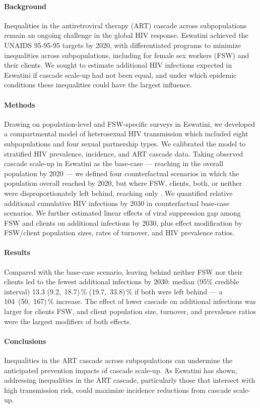 \paragraph{Background}
Inequalities in the antiretroviral therapy (ART) cascade across subpopulations
remain an ongoing challenge in the global HIV response.
Eswatini achieved the UNAIDS 95-95-95 targets by 2020,
with differentiated programs to minimize inequalities across subpopulations,
including for female sex workers (FSW) and their clients.
We sought to estimate additional HIV infections expected in Eswatini
if cascade scale-up had not been equal,
and under which epidemic conditions these inequalities could have the largest influence.
\paragraph{Methods}
Drawing on population-level and FSW-specific surveys in Eswatini,
we developed a compartmental model of heterosexual HIV transmission
which included eight subpopulations and four sexual partnership types.
We calibrated the model to stratified HIV prevalence, incidence, and ART cascade data.
Taking observed cascade scale-up in Eswatini as the base-case
--- reaching \cashi in the overall population by 2020 ---
we defined four counterfactual scenarios in which
the population overall reached \casmd by 2020,
but where FSW, clients, both, or neither
were disproportionately left behind, reaching only \caslo.
We quantified relative additional cumulative HIV infections by 2030
in counterfactual \vs base-case scenarios.
We further estimated linear effects of
viral suppression gap among FSW and clients on additional infections by 2030, plus
effect modification by FSW/client population sizes, rates of turnover, and HIV prevalence ratios.
\paragraph{Results}
Compared with the base-case scenario, leaving behind neither FSW nor their clients
led to the fewest additional infections by 2030: median (95\% credible interval)
13.3 (9.2,~18.7)\,\%  (19.7,~33.8)\,\% if both were left behind
--- a 104~(50,~167)\,\% increase.
The effect of lower cascade on additional infections was larger for clients \vs FSW, and
client population size, turnover, and prevalence ratios were the largest modifiers of both effects.
\paragraph{Conclusions}
Inequalities in the ART cascade across subpopulations
can undermine the anticipated prevention impacts of cascade scale-up.
As Eswatini has shown,
addressing inequalities in the ART cascade,
particularly those that intersect with high transmission risk,
could maximize incidence reductions from cascade scale-up.
